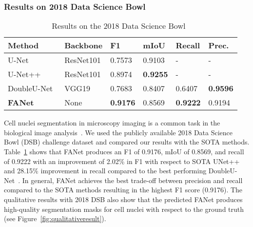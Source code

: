 \documentclass[journal]{IEEEtran}
\begin{document}
\subsubsection{Results on 2018 Data Science Bowl} 
\begin{table}[!t]
\footnotesize
\centering
\caption{Results on the 2018 Data Science Bowl~\cite{caicedo2019nucleus}}
\vspace{0.1cm}
\begin{tabular}{@{}l|l|l|l|l|l@{}}
\toprule
\textbf{Method} &\textbf{Backbone} & \textbf{F1}  & \textbf{mIoU} &\textbf{Recall}& \textbf{Prec.} \\
\hline
\hline
U-Net~\cite{ronneberger2015u} & ResNet101  & 0.7573 & 0.9103 & - & -  \\ U-Net++~\cite{zhou2019unet++} & ResNet101  & 0.8974  & \textbf{0.9255} & - & -    \\ DoubleU-Net~\cite{jha2020doubleu} & VGG19  & 0.7683 & 0.8407 & 0.6407 & \textbf{0.9596}  \\
\textbf{FANet} & None  &\textbf{0.9176}& 0.8569 & \textbf{0.9222} & 0.9194\\ \bottomrule
\end{tabular}
\label{tab:DSB}
\end{table}
Cell nuclei segmentation in microscopy imaging is a common task in the biological image analysis~\cite{caicedo2019nucleus}. We used the publicly available 2018 Data Science Bowl (DSB) challenge dataset and compared our results with the \ac{SOTA} methods. Table~\ref{tab:DSB} shows that FANet produces an F1 of 0.9176, \ac{mIoU} of 0.8569, and recall of 0.9222 with an improvement of 2.02\% in F1 with respect to \ac{SOTA} UNet++~\cite{zhou2019unet++} and 28.15\% improvement in recall compared to the best performing DoubleU-Net~\cite{jha2020doubleu}. In general, FANet achieves the best trade-off between precision and recall compared to the \ac{SOTA} methods resulting in the highest F1 score (0.9176). The qualitative results with 2018 DSB also show that the predicted FANet produces high-quality segmentation masks for cell nuclei with respect to the ground truth (see Figure~\ref{fig:qualitativeresult}). 
\end{document}
